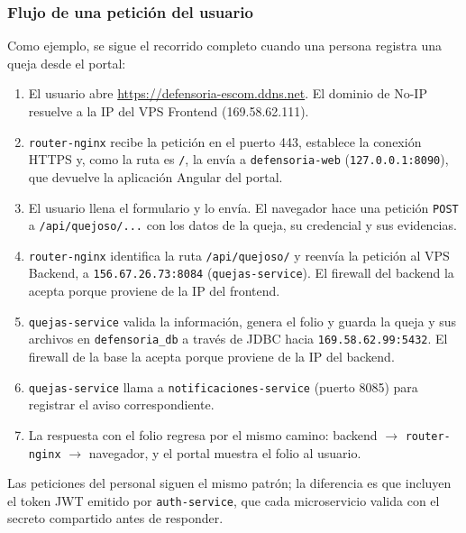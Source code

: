 \subsubsection{Flujo de una petición del usuario}
Como ejemplo, se sigue el recorrido completo cuando una persona registra una queja desde el portal:

\begin{enumerate}
  \item El usuario abre \url{https://defensoria-escom.ddns.net}. El dominio de No-IP resuelve a la IP del VPS Frontend (169.58.62.111).
  \item \texttt{router-nginx} recibe la petición en el puerto 443, establece la conexión HTTPS y, como la ruta es \texttt{/}, la envía a \texttt{defensoria-web} (\texttt{127.0.0.1:8090}), que devuelve la aplicación Angular del portal.
  \item El usuario llena el formulario y lo envía. El navegador hace una petición \texttt{POST} a \texttt{/api/quejoso/...} con los datos de la queja, su credencial y sus evidencias.
  \item \texttt{router-nginx} identifica la ruta \texttt{/api/quejoso/} y reenvía la petición al VPS Backend, a \texttt{156.67.26.73:8084} (\texttt{quejas-service}). El firewall del backend la acepta porque proviene de la IP del frontend.
  \item \texttt{quejas-service} valida la información, genera el folio y guarda la queja y sus archivos en \texttt{defensoria\_db} a través de JDBC hacia \texttt{169.58.62.99:5432}. El firewall de la base la acepta porque proviene de la IP del backend.
  \item \texttt{quejas-service} llama a \texttt{notificaciones-service} (puerto 8085) para registrar el aviso correspondiente.
  \item La respuesta con el folio regresa por el mismo camino: backend $\rightarrow$ \texttt{router-nginx} $\rightarrow$ navegador, y el portal muestra el folio al usuario.
\end{enumerate}

Las peticiones del personal siguen el mismo patrón; la diferencia es que incluyen el token JWT emitido por \texttt{auth-service}, que cada microservicio valida con el secreto compartido antes de responder.
